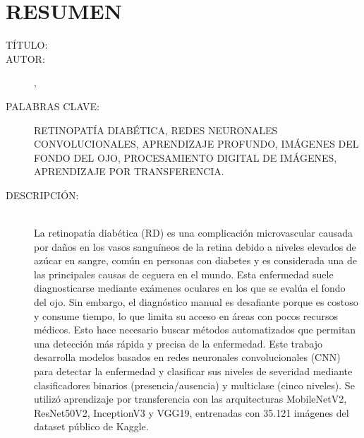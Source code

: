 \chapter*{RESUMEN}

\footnotesize{
  \begin{description}
    \item[TÍTULO:] \MakeUppercase{\titulo}
    \item[AUTOR:]{\autora}, {\autorb}
    \item[PALABRAS CLAVE:] RETINOPATÍA DIABÉTICA, REDES NEURONALES CONVOLUCIONALES,
    APRENDIZAJE PROFUNDO, IMÁGENES DEL FONDO DEL OJO, PROCESAMIENTO DIGITAL DE IMÁGENES,
    APRENDIZAJE POR TRANSFERENCIA.
    \item[DESCRIPCIÓN:] \hfill \\
          La retinopatía diabética (RD) es una complicación microvascular causada por
          daños en los vasos sanguíneos de la retina debido a niveles elevados de azúcar en sangre,
          común en personas con diabetes y es considerada una de las principales causas de
          ceguera en el mundo. Esta enfermedad suele diagnosticarse mediante exámenes oculares en
          los que se evalúa el fondo del ojo. Sin embargo, el diagnóstico manual es desafiante
          porque es costoso y consume tiempo, lo que limita su acceso en áreas con pocos
          recursos médicos. Esto hace necesario buscar métodos automatizados que permitan
          una detección más rápida y precisa de la enfermedad. Este trabajo desarrolla modelos 
          basados en redes neuronales convolucionales (CNN) para detectar la enfermedad y clasificar
          sus niveles de severidad mediante clasificadores binarios (presencia/ausencia) y multiclase
          (cinco niveles). Se utilizó aprendizaje por transferencia con las arquitecturas MobileNetV2, 
          ResNet50V2, InceptionV3 y VGG19, entrenadas con 35.121 imágenes del dataset público de Kaggle. 

\end{description}}
